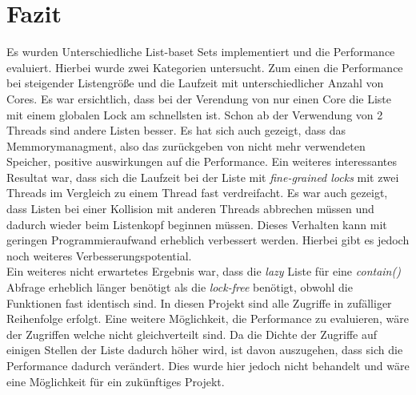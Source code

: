 \section{Fazit}
Es wurden Unterschiedliche List-baset Sets implementiert und die Performance evaluiert.
Hierbei wurde zwei Kategorien untersucht. Zum einen die Performance bei steigender Listengröße und
die Laufzeit mit unterschiedlicher Anzahl von Cores. 
Es war ersichtlich, dass bei der Verendung von nur einen Core die Liste mit 
einem globalen Lock am schnellsten ist. Schon ab der Verwendung von 2 Threads sind
andere Listen besser. Es hat sich auch gezeigt, dass das Memmorymanagment, also das zurückgeben
von nicht mehr verwendeten Speicher, positive auswirkungen auf die Performance. Ein weiteres
interessantes Resultat war, dass sich die Laufzeit bei der Liste mit \textit{fine-grained locks} mit zwei Threads 
im Vergleich zu einem Thread fast verdreifacht. Es war auch gezeigt, dass Listen bei einer Kollision
mit anderen Threads abbrechen müssen und dadurch wieder beim Listenkopf beginnen müssen. 
Dieses Verhalten kann mit geringen Programmieraufwand erheblich verbessert werden. Hierbei 
gibt es jedoch noch weiteres Verbesserungspotential. \\
Ein weiteres nicht erwartetes Ergebnis war, dass die \textit{lazy} Liste für eine \textit{contain()} Abfrage
erheblich länger benötigt als die \textit{lock-free} benötigt, obwohl die Funktionen fast identisch sind. 
In diesen Projekt sind alle Zugriffe in zufälliger Reihenfolge erfolgt. Eine weitere Möglichkeit, die Performance
zu evaluieren, wäre der Zugriffen welche nicht gleichverteilt sind. Da die Dichte der Zugriffe auf einigen
Stellen der Liste dadurch höher wird, ist davon auszugehen, dass sich die Performance dadurch verändert. 
Dies wurde hier jedoch nicht behandelt und wäre eine Möglichkeit für ein zukünftiges Projekt. 